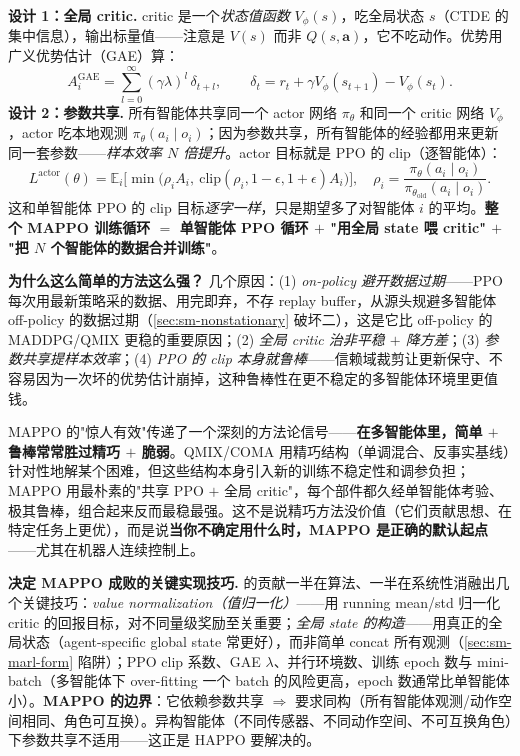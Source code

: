 \textbf{设计 1：全局 critic.} critic 是一个\emph{状态值函数} $V_\phi(s)$，吃全局状态 $s$（CTDE 的集中信息），输出标量值——注意是 $V(s)$ 而非 $Q(s,\mathbf{a})$，它不吃动作。优势用广义优势估计（GAE）算：
\begin{equation}
  A_i^{\text{GAE}}=\sum_{l=0}^{\infty}(\gamma\lambda)^l\,\delta_{t+l},\qquad \delta_t=r_t+\gamma V_\phi(s_{t+1})-V_\phi(s_t).
  \label{eq:sm-mappo-gae}
\end{equation}
\textbf{设计 2：参数共享.} 所有智能体共享同一个 actor 网络 $\pi_\theta$ 和同一个 critic 网络 $V_\phi$，actor 吃本地观测 $\pi_\theta(a_i\mid o_i)$；因为参数共享，所有智能体的经验都用来更新同一套参数——\emph{样本效率 $N$ 倍提升}。actor 目标就是 PPO 的 clip（逐智能体）：
\begin{equation}
  L^{\text{actor}}(\theta)=\mathbb{E}_i\Big[\min\big(\rho_i A_i,\ \mathrm{clip}(\rho_i,1-\epsilon,1+\epsilon)A_i\big)\Big],\quad \rho_i=\frac{\pi_\theta(a_i\mid o_i)}{\pi_{\theta_{\text{old}}}(a_i\mid o_i)}.
  \label{eq:sm-mappo-clip}
\end{equation}
这和单智能体 PPO 的 clip 目标\emph{逐字一样}，只是期望多了对智能体 $i$ 的平均。\textbf{整个 MAPPO 训练循环 $=$ 单智能体 PPO 循环 $+$ "用全局 state 喂 critic" $+$ "把 $N$ 个智能体的数据合并训练"}。

\textbf{为什么这么简单的方法这么强？} 几个原因：(1) \emph{on-policy 避开数据过期}——PPO 每次用最新策略采的数据、用完即弃，不存 replay buffer，从源头规避多智能体 off-policy 的数据过期（\cref{sec:sm-nonstationary} 破坏二），这是它比 off-policy 的 MADDPG/QMIX 更稳的重要原因；(2) \emph{全局 critic 治非平稳 $+$ 降方差}；(3) \emph{参数共享提样本效率}；(4) \emph{PPO 的 clip 本身就鲁棒}——信赖域裁剪让更新保守、不容易因为一次坏的优势估计崩掉，这种鲁棒性在更不稳定的多智能体环境里更值钱。

\begin{insight}
MAPPO 的"惊人有效"传递了一个深刻的方法论信号——\textbf{在多智能体里，简单 $+$ 鲁棒常常胜过精巧 $+$ 脆弱}。QMIX/COMA 用精巧结构（单调混合、反事实基线）针对性地解某个困难，但这些结构本身引入新的训练不稳定性和调参负担；MAPPO 用最朴素的"共享 PPO $+$ 全局 critic"，每个部件都久经单智能体考验、极其鲁棒，组合起来反而最稳最强。这不是说精巧方法没价值（它们贡献思想、在特定任务上更优），而是说\textbf{当你不确定用什么时，MAPPO 是正确的默认起点}——尤其在机器人连续控制上。
\end{insight}

\begin{note}
\textbf{决定 MAPPO 成败的关键实现技巧.}\;\cite{yu2022mappo} 的贡献一半在算法、一半在系统性消融出几个关键技巧：\emph{value normalization（值归一化）}——用 running mean/std 归一化 critic 的回报目标，对不同量级奖励至关重要；\emph{全局 state 的构造}——用真正的全局状态（agent-specific global state 常更好），而非简单 concat 所有观测（\cref{sec:sm-marl-form} 陷阱）；PPO clip 系数、GAE $\lambda$、并行环境数、训练 epoch 数与 mini-batch（多智能体下 over-fitting 一个 batch 的风险更高，epoch 数通常比单智能体小）。\textbf{MAPPO 的边界}：它依赖参数共享 $\Rightarrow$ 要求同构（所有智能体观测/动作空间相同、角色可互换）。异构智能体（不同传感器、不同动作空间、不可互换角色）下参数共享不适用——这正是 HAPPO 要解决的。
\end{note}

